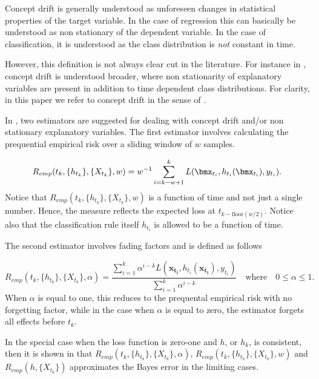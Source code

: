 Concept drift is generally understood as unforeseen changes in statistical properties of the target variable.  In the case of regression this can basically be understood as non stationary of the dependent variable.  In the case of classification, it is understood as the class distribution is \emph{not} constant in time.  

However, this definition is not always clear cut in the literature.  For instance in \cite{Brz14}, concept drift is understood broader, where non stationarity of explanatory variables are present in addition to time dependent class distributions.   For clarity, in this paper we refer to concept drift in the sense of \cite{Brz14}.

In \cite{Gam13}, two estimators are suggested for dealing with concept drift and/or non stationary explanatory variables.  The first estimator involves calculating the prequential empirical risk over a sliding window of $w$ samples. 

\begin{equation}
\label{eq:prequentialRisk2}
R_{emp}(t_k, \{h_{t_k}\}, \{X_{t_k}\}, w) = w^{-1} \sum_{i=k - w +1}^k L(\bmx_{t_i} , h_{t_i}(\bmx_{t_i} ), y_{t_i}).
\end{equation}
Notice that $R_{emp}(t_k, \{h_{t_k}\}, \{X_{t_k}\}, w)$ is a function of time and not just a single number.  Hence, the measure reflects the expected loss at $t_{k-\mbox{floor}(w/2)}$.  Notice also that the classification rule itself $h_{t_i}$ is allowed to be a function of time.

The second estimator involves fading factors and is defined as follows

\begin{equation}
\label{eq:prequentialRisk3}
R_{emp}(t_k, \{h_{t_k}\}, \{X_{t_k}\}, \alpha) =\frac{\sum_{i=1}^k \alpha^{i-k}L(\bm{x_{t_i}} , h_{t_i}(\bm{x_{t_i}} ), y_{t_i})}{\sum_{i=1}^k \alpha^{i-k}} \quad \mbox{where} \quad 0 \leq \alpha \leq 1.
\end{equation}
When $\alpha$ is equal to one, this reduces to the prequental empirical risk with no forgetting factor, while in the case when $\alpha$ is equal to zero, the estimator forgets all effects before $t_k$.

In the special case when the loss function is zero-one and $h$, or $h_k$, is consistent, then it is shown in \cite{Gam13} that 
$R_{emp}(t_k, \{h_{t_k}\}, \{X_{t_k}\}, \alpha)$, $R_{emp}(t_k, \{h_{t_k}\}, \{X_{t_k}\}, w) $ and $R_{emp}(h, \{X_{t_k}\})$ approximates the Bayes error in the limiting cases.

